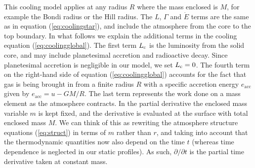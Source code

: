 \documentclass[apj]{emulateapj}
\newcommand{\co}{_{\rm c}}
\begin{document}
This cooling model applies at any radius $R$ where the mass enclosed is $M$, for example the Bondi radius or the Hill radius. The $L$, $\Gamma$ and $\dot{E}$ terms are the same as in equation (\ref{eq:coolingstar}), and include the atmosphere from the core to the top boundary. In what follows we explain the additional terms in the cooling equation (\ref{eq:coolingglobal}). The first term $L\co$ is the luminosity from the solid core, and may include planetesimal accretion and radioactive decay. Since planetesimal accretion is negligible in our model, we set $L\co=0$. The fourth term on the right-hand side of equation (\ref{eq:coolingglobal}) accounts for the fact that gas is being brought in from a finite radius $R$ with a specific accretion energy $e_{\mathrm{acc}}$ given by $e_{\mathrm{acc}}=u-G M/R$. The last term represents the work done on a mass element as the atmosphere contracts. In the partial derivative the enclosed mass variable $m$ is kept fixed, and the derivative is evaluated at the surface with total enclosed mass $M$. We can think of this as rewriting the atmosphere structure equations (\ref{eq:struct}) in terms of $m$ rather than $r$, and taking into account that the thermodynamic quantities now also depend on the time $t$ (whereas time dependence is neglected in our static profiles). As such, $\partial / \partial t$ is the partial time derivative taken at constant mass. 




\end{document}
